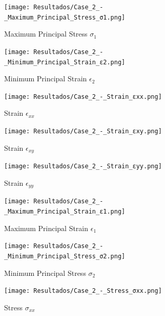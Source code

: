 \documentclass[12pt]{article}
\begin{document}
\begin{figure}[H]
    \centering
    \begin{minipage}{0.48\textwidth}
        \centering
        \texttt{[image: Resultados/Case\_2\_-\_Maximum\_Principal\_Stress\_σ1.png]}
        \caption{Maximum Principal Stress $\sigma_1$}
        \label{fig:fig13}
    \end{minipage}
    \hfill
    \begin{minipage}{0.48\textwidth}
        \centering
        \texttt{[image: Resultados/Case\_2\_-\_Minimum\_Principal\_Strain\_ε2.png]}
        \caption{Minimum Principal Strain $\epsilon_2$}
        \label{fig:fig14}
    \end{minipage}
\end{figure}

\begin{figure}[H]
    \centering
    \begin{minipage}{0.48\textwidth}
        \centering
        \texttt{[image: Resultados/Case\_2\_-\_Strain\_εxx.png]}
        \caption{Strain $\epsilon_{xx}$}
        \label{fig:fig15}
    \end{minipage}
    \hfill
    \begin{minipage}{0.48\textwidth}
        \centering
        \texttt{[image: Resultados/Case\_2\_-\_Strain\_εxy.png]}
        \caption{Strain $\epsilon_{xy}$}
        \label{fig:fig16}
    \end{minipage}
\end{figure}

\begin{figure}[H]
    \centering
    \begin{minipage}{0.48\textwidth}
        \centering
        \texttt{[image: Resultados/Case\_2\_-\_Strain\_εyy.png]}
        \caption{Strain $\epsilon_{yy}$}
        \label{fig:fig17}
    \end{minipage}
    \hfill
    \begin{minipage}{0.48\textwidth}
        \centering
        \texttt{[image: Resultados/Case\_2\_-\_Maximum\_Principal\_Strain\_ε1.png]}
        \caption{Maximum Principal Strain $\epsilon_1$}
        \label{fig:fig18}
    \end{minipage}
\end{figure}

\begin{figure}[H]
    \centering
    \begin{minipage}{0.48\textwidth}
        \centering
        \texttt{[image: Resultados/Case\_2\_-\_Minimum\_Principal\_Stress\_σ2.png]}
        \caption{Minimum Principal Stress $\sigma_2$}
        \label{fig:fig19}
    \end{minipage}
    \hfill
    \begin{minipage}{0.48\textwidth}
        \centering
        \texttt{[image: Resultados/Case\_2\_-\_Stress\_σxx.png]}
        \caption{Stress $\sigma_{xx}$}
        \label{fig:fig20}
    \end{minipage}
\end{figure}
\end{document}

